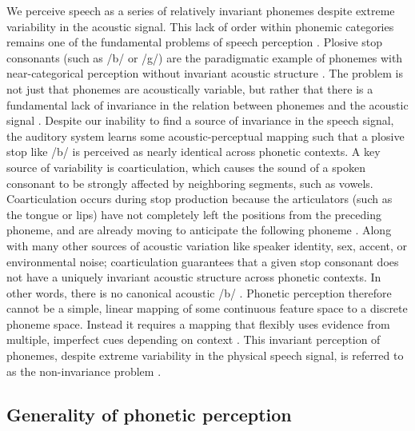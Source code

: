 We perceive speech as a series of relatively invariant phonemes despite extreme variability in the acoustic signal. This lack of order within phonemic categories remains one of the fundamental problems of speech perception \citep{Sussman1998}. Plosive stop consonants (such as /b/ or /g/) are the paradigmatic example of phonemes with near-categorical perception \citep{Holt2010,Kronrod2016a,LIBERMAN1957} without invariant acoustic structure \citep{Elman1988,Kluender1987}. The problem is not just that phonemes are acoustically variable, but rather that there is a fundamental lack of invariance in the relation between phonemes and the acoustic signal \citep{Kluender1987}. Despite our inability to find a source of invariance in the speech signal, the auditory system learns some acoustic-perceptual mapping such that a plosive stop like /b/ is perceived as nearly identical across phonetic contexts. A key source of variability is coarticulation, which causes the sound of a spoken consonant to be strongly affected by neighboring segments, such as vowels. Coarticulation occurs during stop production because the articulators (such as the tongue or lips) have not completely left the positions from the preceding phoneme, and are already moving to anticipate the following phoneme \citep{Liberman1967,Farnetani1990}.  Along with many other sources of acoustic variation like speaker identity, sex, accent, or environmental noise; coarticulation guarantees that a given stop consonant does not have a uniquely invariant acoustic structure across phonetic contexts. In other words, there is no canonical acoustic /b/ \citep{Liberman1967,Holt2010}. Phonetic perception therefore cannot be a simple, linear mapping of some continuous feature space to a discrete phoneme space. Instead it requires a mapping that flexibly uses evidence from multiple, imperfect cues depending on context \citep{Holt2010, Diehl2004}. This invariant perception of phonemes, despite extreme variability in the physical speech signal, is referred to as the non-invariance problem \citep{Perkell1986}.

\subsection{Generality of phonetic perception}

